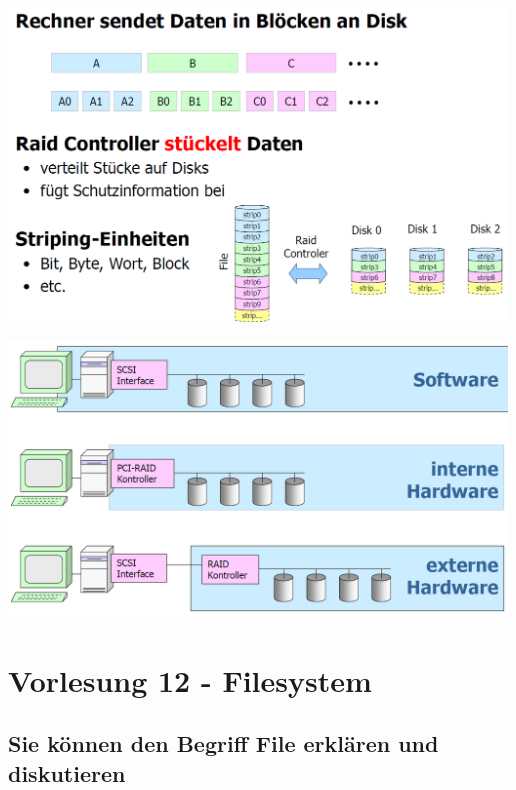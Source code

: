 \documentclass{report}
\newenvironment{Figure}
	{\par\medskip\noindent\minipage{\linewidth}}
	{\endminipage\par\medskip}
\theoremstyle{definition}
\theoremstyle{example}
\begin{document}
\begin{Figure}
\centering
\includegraphics[width=500px]{img/RAIDPrinzip.png}
	\label{fig:Abbildung des Grundprinzipes von RAID}
\end{Figure}

\begin{Figure}
\centering
\includegraphics[width=500px]{img/RAIDFormen.png}
	\label{fig:Abbildung Realisierungsformen von RAID}
\end{Figure}


\chapter{Vorlesung 12 - Filesystem}

\section{Sie können den Begriff File erklären und diskutieren}
\end{document}
